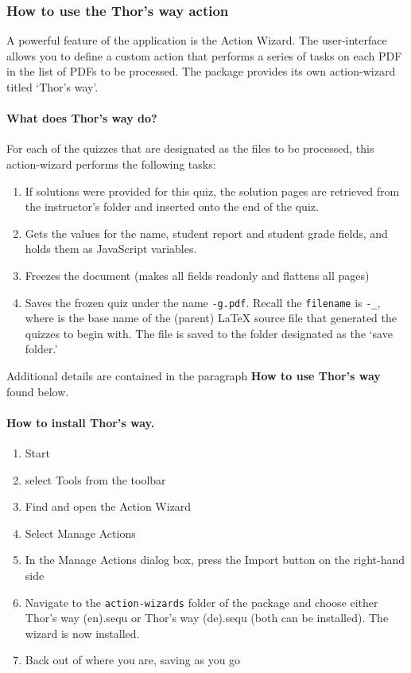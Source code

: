 \documentclass{article}
\begin{document}
\subsubsection{How to use the \textsf{Thor's way} action}\label{sss:TW}

A powerful feature of the  application is the \textsf{Action
Wizard}. The user-interface allows you to define a custom action that
performs a series of tasks on each PDF in the list of PDFs to be processed.
The  package provides its own action-wizard titled
`\textsf{Thor's way}'.

\paragraph*{What does \textsf{Thor's way} do?} For each of the quizzes that are
designated as the files to be processed, this action-wizard performs the following tasks:
\begin{enumerate}
  \item If solutions were provided for this quiz, the solution pages are
      retrieved from the instructor's folder and inserted onto the end of
      the quiz.
  \item Gets the values for the name, student report and student grade
      fields, and holds them as JavaScript variables.
  \item Freezes the document (makes all fields readonly and flattens all
      pages)
  \item Saves the frozen quiz under the name
      \texttt{-g.pdf}. Recall the \texttt{filename} is
      \texttt{-\_}, where 
      is the base name of the (parent) {\LaTeX} source file that generated
      the quizzes to begin with. The file is saved to the folder designated
      as the `save folder.'
\end{enumerate}
Additional details are contained in the paragraph \textbf{How to use
\textsf{Thor's way}} found below.

\paragraph*{How to install \textsf{Thor's way}.}
\begin{enumerate}
  \item Start 
  \item select \textsf{Tools} from the toolbar
  \item Find and open the \textsf{Action Wizard}
  \item Select \textsf{Manage Actions}
  \item In the \textsf{Manage Actions} dialog box, press the
      \textsf{Import} button on the right-hand side
  \item Navigate to the \texttt{action-wizards} folder of the
       package and choose either \textsf{Thor's way (en).sequ}
      or \textsf{Thor's way (de).sequ} (both can be installed).
      The wizard is now installed.
  \item Back out of where you are, saving as you go
\end{enumerate}
\end{document}
